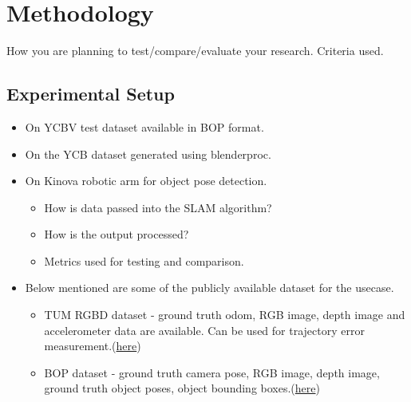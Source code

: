 \documentclass[report.tex]{subfiles}
\begin{document}
    \chapter{Methodology}

    How you are planning to test/compare/evaluate your research.
    Criteria used.
    


    \section{Experimental Setup}
    \begin{itemize}
        \item On YCBV test dataset available in BOP format.
        \item On the YCB dataset generated using blenderproc.
        \item On Kinova robotic arm for object pose detection.
        \begin{itemize}
        \item How is data passed into the SLAM algorithm?
        \item How is the output processed?
        \item Metrics used for testing and comparison.
    \end{itemize}
    \end{itemize}
        \begin{itemize}
\item Below mentioned are some of the publicly available dataset for the usecase.
\begin{itemize}
    \item TUM RGBD dataset\cite{rgbd} - ground truth odom, RGB image, depth image and accelerometer data are available. Can be used for trajectory error measurement.(\href{https://cvg.cit.tum.de/data/datasets/rgbd-dataset/download}{here})
    \item BOP dataset - ground truth camera pose, RGB image, depth image, ground truth object poses, object bounding boxes.(\href{https://bop.felk.cvut.cz/datasets/)}{here})
\end{itemize}
\end{itemize}
\end{document}
